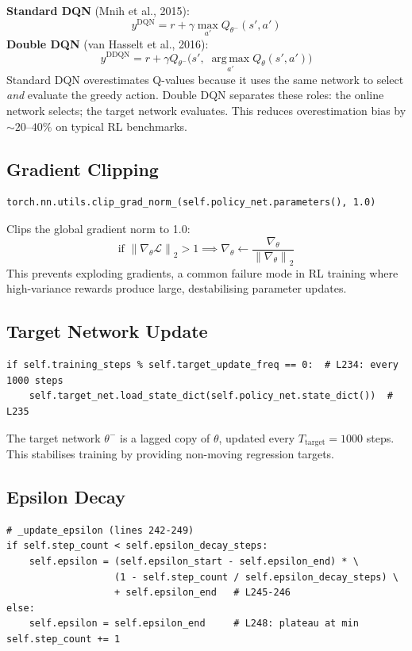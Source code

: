 \documentclass[12pt,a4paper,twoside]{report}
\theoremstyle{definition}
\newcommand{\argmax}{\operatorname*{arg\,max}}
\newcommand{\norm}[1]{\left\lVert #1 \right\rVert}
\begin{document}
\begin{mathbox}
\textbf{Standard DQN} (Mnih et al., 2015):
\[
  y^{\text{DQN}} = r + \gamma \max_{a'} Q_{\theta^-}(s', a')
\]
\textbf{Double DQN} (van Hasselt et al., 2016):
\[
  y^{\text{DDQN}} = r + \gamma Q_{\theta^-}\!\bigl(s',\; \argmax_{a'}Q_\theta(s',a')\bigr)
\]
Standard DQN overestimates Q-values because it uses the same network to select
\emph{and} evaluate the greedy action. Double DQN separates these roles:
the online network selects; the target network evaluates. This reduces
overestimation bias by $\sim20$--$40\%$ on typical RL benchmarks.
\end{mathbox}

\subsection{Gradient Clipping}

\begin{lstlisting}
torch.nn.utils.clip_grad_norm_(self.policy_net.parameters(), 1.0)
\end{lstlisting}

Clips the global gradient norm to 1.0:
\[
  \text{if } \norm{\nabla_\theta \mathcal{L}}_2 > 1 \implies
  \nabla_\theta \leftarrow \frac{\nabla_\theta}{\norm{\nabla_\theta}_2}
\]
This prevents exploding gradients, a common failure mode in RL training where
high-variance rewards produce large, destabilising parameter updates.

\subsection{Target Network Update}

\begin{lstlisting}
if self.training_steps % self.target_update_freq == 0:  # L234: every 1000 steps
    self.target_net.load_state_dict(self.policy_net.state_dict())  # L235
\end{lstlisting}

The target network $\theta^-$ is a lagged copy of $\theta$, updated every
$T_{\text{target}}=1000$ steps. This stabilises training by providing
non-moving regression targets.

\subsection{Epsilon Decay}

\begin{lstlisting}
# _update_epsilon (lines 242-249)
if self.step_count < self.epsilon_decay_steps:
    self.epsilon = (self.epsilon_start - self.epsilon_end) * \
                   (1 - self.step_count / self.epsilon_decay_steps) \
                   + self.epsilon_end   # L245-246
else:
    self.epsilon = self.epsilon_end     # L248: plateau at min
self.step_count += 1
\end{lstlisting}
\end{document}
